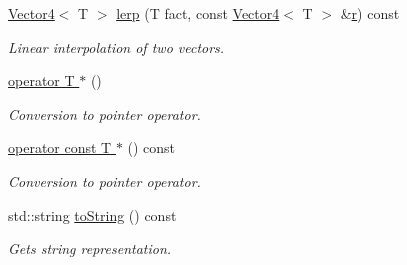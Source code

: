 \begin{DoxyCompactItemize}
\hyperlink{class_vector4}{Vector4}$<$ T $>$ \hyperlink{class_vector4_a59a2b76485334331aa3a2759f3ff45b0}{lerp} (T fact, const \hyperlink{class_vector4}{Vector4}$<$ T $>$ \&\hyperlink{class_vector4_add0f79fe4a8f6d4e1d2aadb2f0c9bbdd}{r}) const 
\begin{DoxyCompactList}\small\item\em Linear interpolation of two vectors. \item\end{DoxyCompactList}\item 
\hyperlink{class_vector4_ac7f1f6e3b48b7878434200d7f2ff035c}{operator T $\ast$} ()
\begin{DoxyCompactList}\small\item\em Conversion to pointer operator. \item\end{DoxyCompactList}\item 
\hyperlink{class_vector4_a6bd576e3ee44ba853b2c8f854a237b2e}{operator const T $\ast$} () const 
\begin{DoxyCompactList}\small\item\em Conversion to pointer operator. \item\end{DoxyCompactList}\item 
std::string \hyperlink{class_vector4_af3ca83cdb1ee34545c18707232dfbc3d}{toString} () const 
\begin{DoxyCompactList}\small\item\em Gets string representation. \item\end{DoxyCompactList}\end{DoxyCompactItemize}
